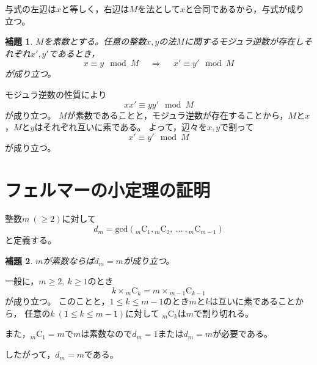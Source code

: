 \documentclass{article}
\makeatletter
\renewenvironment{proof}[1][\proofname]{\par
        \pushQED{\qed}
        \normalfont
        \topsep6\p@\@plus6\p@ \trivlist
        \item[\hskip\labelsep{\bfseries #1}\@addpunct{\bfseries}]\ignorespaces
    }{%
        \popQED\endtrivlist\@endpefalse
    }
\renewcommand{\proofname}{証明.}
\newtheorem{lemma}{補題}
\newcommand{\combination}[2]{{}_{#1} \mathrm{C}_{#2}}
\makeatother
\begin{document}
\begin{proof}
    与式の左辺は$x$と等しく，右辺は$M$を法として$x$と合同であるから，与式が成り立つ。
\end{proof}

\begin{screen}
    \begin{lemma}
        \label{lemma:inv:3}
        $M$を素数とする。任意の整数$x, y$の法$M$に関するモジュラ逆数が存在しそれぞれ$x', y'$であるとき，
        \begin{equation}
            x \equiv y \mod{M}
            \hspace{15pt} \Longrightarrow \hspace{15pt}
            x' \equiv y' \mod{M}
        \end{equation}
        が成り立つ。
    \end{lemma}
\end{screen}

\begin{proof}
    モジュラ逆数の性質により
    \begin{equation}
        xx' \equiv yy' \mod{M}
    \end{equation}
    が成り立つ。
    $M$が素数であることと，モジュラ逆数が存在することから，$M$と$x$，$M$と$y$はそれぞれ互いに素である。
    よって，辺々を$x, y$で割って
    \begin{equation}
        x' \equiv y' \mod{M}
    \end{equation}
    が成り立つ。
\end{proof}



\section{フェルマーの小定理の証明}

整数$m\ (\geq 2)$に対して
\begin{equation}
    d_m = \mathrm{gcd} (\combination{m}{1}, \combination{m}{2},\ \ldots\ , \combination{m}{m-1})
\end{equation}
と定義する。

\begin{screen}
    \begin{lemma}
        \label{lemma:flt:1}
        $m$が素数ならば$d_m = m$が成り立つ。
    \end{lemma}
\end{screen}

\begin{proof}
    一般に，$m \geq 2,\ k \geq 1$のとき
    \begin{equation}
        k \times \combination{m}{k} = m \times \combination{m - 1}{k - 1}
    \end{equation}
    が成り立つ。
    このことと，$1 \leq k \leq m - 1$のとき$m$と$k$は互いに素であることから，
    任意の$k\ (1 \leq k \leq m - 1)$に対して
    $\combination{m}{k}$は$m$で割り切れる。

    また，$\combination{m}{1} = m$で$m$は素数なので$d_m = 1$または$d_m = m$が必要である。

    したがって，$d_m = m$である。
\end{proof}
\end{document}
